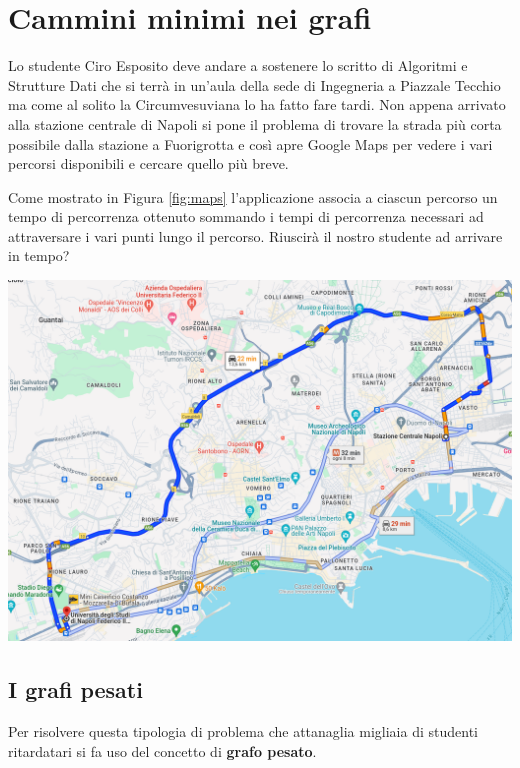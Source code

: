 \section{Cammini minimi nei grafi}
Lo studente Ciro Esposito deve andare a sostenere lo scritto di Algoritmi e Strutture Dati che si terrà in un'aula della sede di Ingegneria a Piazzale Tecchio ma come al solito la Circumvesuviana lo ha fatto fare tardi. Non appena arrivato alla stazione centrale di Napoli si pone il problema di trovare la strada più corta possibile dalla stazione a Fuorigrotta e così apre Google Maps per vedere i vari percorsi disponibili e cercare quello più breve.

Come mostrato in Figura \ref{fig:maps} l'applicazione associa a ciascun percorso un tempo di percorrenza ottenuto sommando i tempi di percorrenza necessari ad attraversare i vari punti lungo il percorso. Riuscirà il nostro studente ad arrivare in tempo?
\begin{center}
	\includegraphics[scale=.45]{res/Maps}
	\label{fig:maps}
\end{center}

\subsection{I grafi pesati}
Per risolvere questa tipologia di problema che attanaglia migliaia di studenti ritardatari si fa uso del concetto di \textbf{grafo pesato}.


